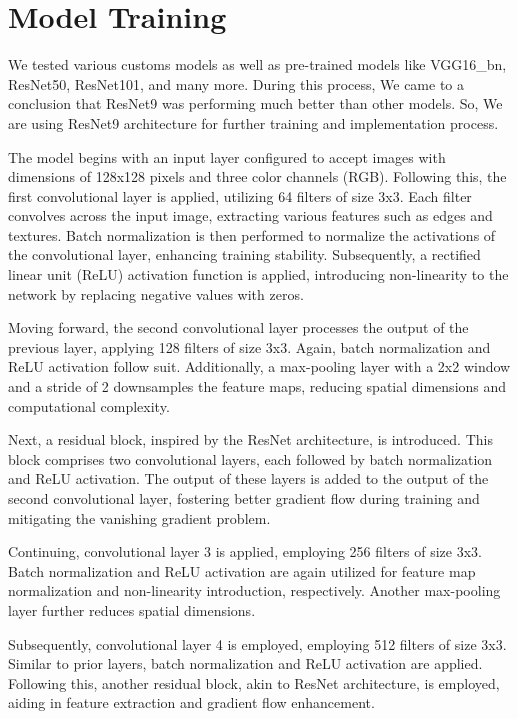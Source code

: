 	\section{Model Training}
		We tested various customs models as well as pre-trained models like VGG16\_bn, ResNet50, ResNet101, and many more. During this process, We came to a conclusion that ResNet9 was performing much better than other models. So, We are using ResNet9 architecture for further training and implementation process.
		
		The model begins with an input layer configured to accept images with dimensions of 128x128 pixels and three color channels (RGB). Following this, the first convolutional layer is applied, utilizing 64 filters of size 3x3. Each filter convolves across the input image, extracting various features such as edges and textures. Batch normalization is then performed to normalize the activations of the convolutional layer, enhancing training stability. Subsequently, a rectified linear unit (ReLU) activation function is applied, introducing non-linearity to the network by replacing negative values with zeros.

		Moving forward, the second convolutional layer processes the output of the previous layer, applying 128 filters of size 3x3. Again, batch normalization and ReLU activation follow suit. Additionally, a max-pooling layer with a 2x2 window and a stride of 2 downsamples the feature maps, reducing spatial dimensions and computational complexity.

		Next, a residual block, inspired by the ResNet architecture, is introduced. This block comprises two convolutional layers, each followed by batch normalization and ReLU activation. The output of these layers is added to the output of the second convolutional layer, fostering better gradient flow during training and mitigating the vanishing gradient problem.

		Continuing, convolutional layer 3 is applied, employing 256 filters of size 3x3. Batch normalization and ReLU activation are again utilized for feature map normalization and non-linearity introduction, respectively. Another max-pooling layer further reduces spatial dimensions.

		Subsequently, convolutional layer 4 is employed, employing 512 filters of size 3x3. Similar to prior layers, batch normalization and ReLU activation are applied. Following this, another residual block, akin to ResNet architecture, is employed, aiding in feature extraction and gradient flow enhancement.

